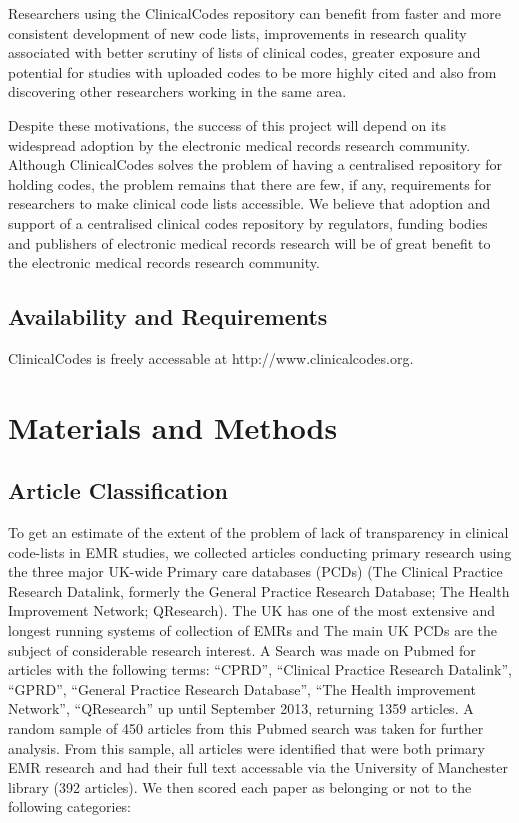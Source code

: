 \documentclass[10pt]{article}
\begin{document}
Researchers using the ClinicalCodes repository can benefit from faster and more consistent development of new code lists, improvements in research quality associated with better scrutiny of lists of clinical codes, greater exposure and potential for studies with uploaded codes to be more highly cited and also from discovering other researchers working in the same area.

Despite these motivations, the success of this project will depend on its widespread adoption by the electronic medical records research community. Although ClinicalCodes solves the problem of having a centralised repository for holding codes, the problem remains that there are few, if any, requirements for researchers to make clinical code lists accessible. We believe that adoption and support of a centralised clinical codes repository by regulators, funding bodies and publishers of electronic medical records research will be of great benefit to the electronic medical records research community.

\subsection*{Availability and Requirements}


ClinicalCodes is freely accessable at http://www.clinicalcodes.org.

\section*{Materials and Methods}

\subsection*{Article Classification}

To get an estimate of the extent of the problem of lack of transparency in clinical code-lists in EMR studies, we collected articles conducting primary research using the three major UK-wide Primary care databases (PCDs) (The Clinical Practice Research Datalink, formerly the General Practice Research Database; The Health Improvement Network; QResearch).  The UK has one of the most extensive and longest running systems of collection of EMRs and The main UK PCDs are the subject of considerable research interest.  A Search was made on Pubmed for articles with the following terms: ``CPRD'', ``Clinical Practice Research Datalink'', ``GPRD'', ``General Practice Research Database'', ``The Health improvement Network'', ``QResearch'' up until September 2013, returning 1359 articles.  A random sample of 450 articles from this Pubmed search was taken for further analysis.  From this sample, all articles were identified that were both primary EMR research and had their full text accessable via the University of Manchester library (392 articles). We then scored each paper as belonging or not to the following categories:
\end{document}
